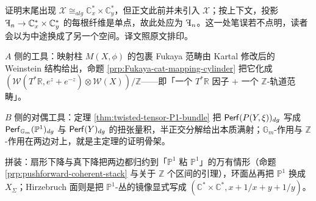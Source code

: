 \begin{yizhu}
证明末尾出现 $\mathcal{X}\cong_{alg}\mathbb{C}_x^{\ast}\times\mathbb{C}_y^{\ast}$，但正文此前并未引入 $\mathcal{X}$；按上下文，投影 $\rF_n\to\mathbb{C}_x^{\ast}\times\mathbb{C}_y^{\ast}$ 的每根纤维是单点，故此处应为 $\rF_n$。这一处笔误若不点明，读者会以为中途换成了另一个空间。译文照原文排印。
\end{yizhu}

\begin{keytakeaways}
  \item $A$ 侧的工具：映射柱 $M(X,\phi)$ 的包裹 Fukaya 范畴由 Kartal 修改后的 Weinstein 结构给出，命题 \ref{prp:Fukaya-cat-mapping-cylinder} 把它化成 $\left(\mathcal{W} (T^{\ast}\mathbb{R},e^z+e^{-z})\otimes\mathcal{W} (X)\right)/\mathbb{Z}$——即「一个 $T^{\ast}\mathbb{R}$ 因子 + 一个 $\mathbb{Z}$-轨道范畴」。
  \item $B$ 侧的对偶工具：定理 \ref{thm:twisted-tensor-P1-bundle} 把 $\operatorname{\mathsf{Perf}}(P(Y,\xi))_{dg}$ 写成 $\operatorname{\mathsf{Perf}}_{\mathbb{G}_m}(\mathbb{P}^1)_{dg}$ 与 $\operatorname{\mathsf{Perf}}(Y)_{dg}$ 的扭张量积，半正交分解给出本质满射；$\mathbb{G}_m$-作用与 $\mathbb{Z}$-作用在两边对上，就是主定理的证明骨架。
  \item 拼装：扇形下降与真下降把两边都归约到「$\mathbb{P}^1$ 粘 $\mathbb{P}^1$」的万有情形（命题 \ref{prp:pushforward-coherent-stack} 与关于 $\mathbb{Z}$ 个区间的引理），环面丛再把 $\mathbb{P}^1$ 换成 $X_{\Sigma}$；Hirzebruch 面则是把 $\mathbb{P}^1$-丛的镜像显式写成 $\left(\mathbb{C}^{\ast}\times\mathbb{C}^{\ast},x+1/x+y+1/y\right)$。
\end{keytakeaways}
